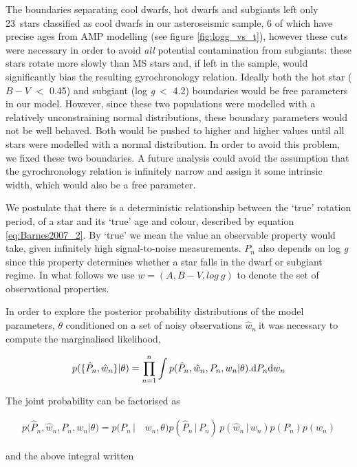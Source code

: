 \documentclass[10pt,preprint]{aastex}
\newcommand{\logg}{log \emph{g}}
\newcommand{\wh}{$\hat{w}_n$}
\newcommand{\ncooldwarfs}{23~}
\begin{document}
The boundaries separating cool dwarfs, hot dwarfs and subgiants left only \ncooldwarfs stars classified as cool dwarfs in our asteroseismic sample, 6 of which have precise ages from AMP modelling (see figure \ref{fig:logg_vs_t}), however these cuts were necessary in order to avoid {\it all} potential contamination from subgiants: these stars rotate more slowly than MS stars and, if left in the sample, would significantly bias the resulting gyrochronology relation.
Ideally both the hot star ($B-V$ $<$ 0.45) and subgiant (\logg$~<$ 4.2) boundaries would be free parameters in our model.
However, since these two populations were modelled with a relatively unconstraining normal distributions, these boundary parameters would not be well behaved.
Both would be pushed to higher and higher values until all stars were modelled with a normal distribution.
In order to avoid this problem, we fixed these two boundaries.
A future analysis could avoid the assumption that the gyrochronology relation is infinitely narrow and assign it some intrinsic width, which would also be a free parameter.

We postulate that there is a deterministic relationship between the `true' rotation period, of a star and its `true' age and colour, described by equation \ref{eq:Barnes2007_2}.
By `true' we mean the value an observable property would take, given infinitely high signal-to-noise measurements.
$P_n$ also depends on \logg$~$since this property determines whether a star falls in the dwarf or subgiant regime.
In what follows we use $w = (A, B-V, log~g)$ to denote the set of observational properties.

In order to explore the posterior probability distributions of the model parameters, $\theta$ conditioned on a set of noisy observations \wh$~$it was necessary to compute the marginalised likelihood,

\begin{equation}
	p(\{\hat{P}_n,\hat{w}_n\}|\theta) =
	\prod_{n=1}^{n} \int p(\hat{P}_n,\hat{w}_n,P_n,w_n|\theta).
	{\rm d}P_n {\rm d}w_n
\label{eq:fulll}
\end{equation}

The joint probability can be factorised as

\begin{align}
	p(\hat{P}_n,\hat{w}_n,P_n,w_n|\theta) = p(P_n\,| & \,w_n,\theta) p(\hat{P}_n\,|\,P_n)\,p(\hat{w}_n\,|\,w_n) p(P_n)p(w_n)
\nonumber
\end{align}

and the above integral written
\end{document}
